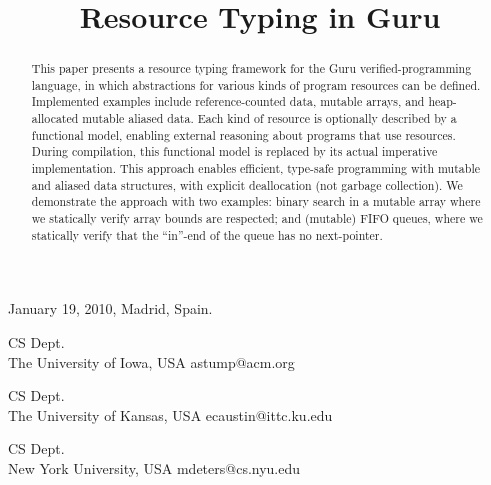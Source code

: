 \documentclass[9pt,natbib]{sigplanconf}
\begin{document}
 {January 19, 2010, Madrid, Spain.}
\copyrightdata{\ } 

\titlebanner{\ }        %
\preprintfooter{\ }   %



\title{Resource Typing in Guru}

{CS Dept.\\ The University of Iowa, USA}
{astump@acm.org}

{CS Dept.\\ The University of Kansas, USA}
{ecaustin@ittc.ku.edu}

{CS Dept.\\ New York University, USA}
{mdeters@cs.nyu.edu}

\maketitle


\begin{abstract}
This paper presents a resource typing framework for the Guru
verified-programming language, in which abstractions for various kinds
of program resources can be defined.  Implemented examples include
reference-counted data, mutable arrays, and heap-allocated mutable
aliased data.  Each kind of resource is optionally described by a
functional model, enabling external reasoning about programs that use
resources.  During compilation, this functional model is replaced by
its actual imperative implementation.  This approach enables
efficient, type-safe programming with mutable and aliased data
structures, with explicit deallocation (not garbage collection).  We
demonstrate the approach with two examples: binary search in a mutable
array where we statically verify array bounds are respected; and
(mutable) FIFO queues, where we statically verify that the ``in''-end
of the queue has no next-pointer.
\end{abstract}

\end{document}
